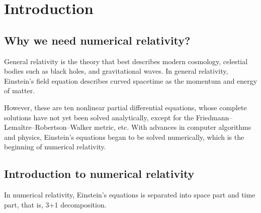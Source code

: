 
\chapter{Introduction} %

\label{Chapter1} %


\section{Why we need numerical relativity?}

General relativity is the theory that best describes modern cosmology, celestial bodies such as black holes, and gravitational waves. In general relativity, Einstein's field equation describes curved spacetime as the momentum and energy of matter.

However, these are ten nonlinear partial differential equations, whose complete solutions have not yet been solved analytically, except for the Friedmann–Lemaître–Robertson–Walker metric, etc. With advances in computer algorithms and physics, Einstein's equations began to be solved numerically, which is the beginning of numerical relativity.

\section{Introduction to numerical relativity}
In numerical relativity, Einstein's equations is separated into space part and time part, that is, 3+1 decomposition.

